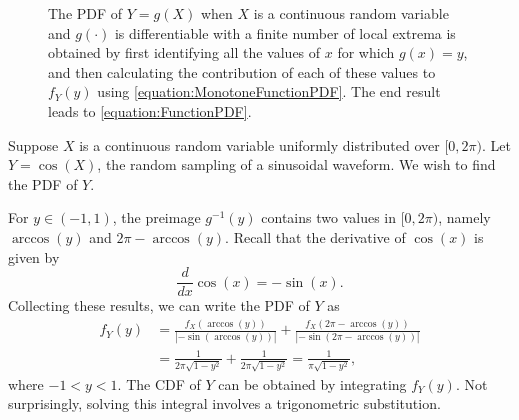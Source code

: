 \begin{figure}[ht]
\begin{center}
\caption{The PDF of $Y = g(X)$ when $X$ is a continuous random variable and $g(\cdot)$ is differentiable with a finite number of local extrema is obtained by first identifying all the values of $x$ for which $g(x) = y$, and then calculating the contribution of each of these values to $f_Y(y)$ using \eqref{equation:MonotoneFunctionPDF}.
The end result leads to \eqref{equation:FunctionPDF}.}
\end{center}
\end{figure}

\begin{example}
Suppose $X$ is a continuous random variable uniformly distributed over $[0, 2 \pi)$.
Let $Y = \cos (X)$, the random sampling of a sinusoidal waveform.
We wish to find the PDF of $Y$.

For $y \in (-1, 1)$, the preimage $g^{-1} (y)$ contains two values in $[0, 2\pi)$, namely $\arccos (y)$ and $2 \pi - \arccos (y)$.
Recall that the derivative of $\cos(x)$ is given by
\begin{equation*}
\frac{d}{dx} \cos (x) = - \sin (x) .
\end{equation*}
Collecting these results, we can write the PDF of $Y$ as
\begin{equation*}
\begin{split}
f_Y (y) &= \frac{f_X( \arccos (y) )}{ \left| - \sin (\arccos (y)) \right|}
+ \frac{f_X( 2 \pi - \arccos (y) )}{ \left| - \sin (2\pi - \arccos (y)) \right| } \\
&= \frac{1}{2 \pi \sqrt{1 - y^2} } + \frac{1}{ 2 \pi \sqrt{ 1 - y^2} }
= \frac{1}{\pi \sqrt{1 - y^2} } ,
\end{split}
\end{equation*}
where $-1 < y < 1$.
The CDF of $Y$ can be obtained by integrating $f_Y (y)$.
Not surprisingly, solving this integral involves a trigonometric substitution.
\end{example}



